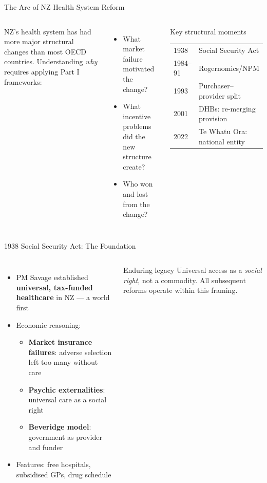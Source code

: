 \documentclass[aspectratio=169, 12pt]{beamer}
\begin{document}
\begin{frame}{The Arc of NZ Health System Reform}
  \begin{columns}
      \small NZ's health system has had more major structural changes than most OECD countries. Understanding \emph{why} requires applying Part I frameworks:
      \begin{itemize}\small
        \item What market failure motivated the change?
        \item What incentive problems did the new structure create?
        \item Who won and lost from the change?
      \end{itemize}
      \begin{block}{Key structural moments}
        \small
        \begin{tabular}{@{}ll@{}}
          1938 & Social Security Act \\
          1984--91 & Rogernomics/NPM \\
          1993 & Purchaser--provider split \\
          2001 & DHBs: re-merging provision \\
          2022 & Te Whatu Ora: national entity \\
        \end{tabular}
      \end{block}
  \end{columns}
\end{frame}

\begin{frame}{1938 Social Security Act: The Foundation}
  \begin{columns}
      \small
      \begin{itemize}
        \item PM Savage established \textbf{universal, tax-funded healthcare} in NZ --- a world first
        \item Economic reasoning:
        \begin{itemize}\small
          \item \textbf{Market insurance failures}: adverse selection left too many without care
          \item \textbf{Psychic externalities}: universal care as a social right
          \item \textbf{Beveridge model}: government as provider and funder
        \end{itemize}
        \item Features: free hospitals, subsidised GPs, drug schedule
      \end{itemize}
      \begin{alertblock}{Enduring legacy}
        \small Universal access as a \emph{social right}, not a commodity. All subsequent reforms operate within this framing.
      \end{alertblock}
  \end{columns}
\end{frame}
\end{document}
